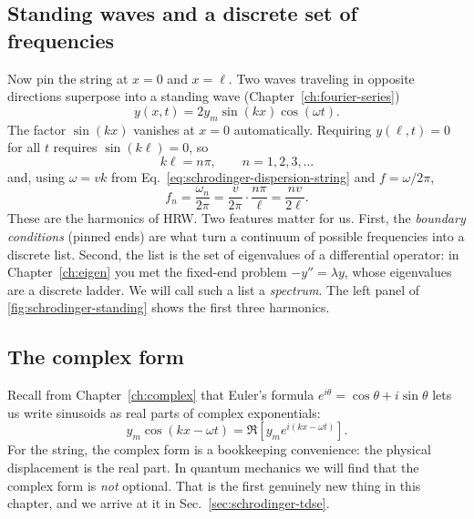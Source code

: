 \subsection{Standing waves and a discrete set of frequencies}

Now pin the string at $x=0$ and $x=\ell$. Two waves traveling in opposite directions superpose into a standing wave (Chapter~\ref{ch:fourier-series})
\begin{equation}
y(x,t)=2y_m\sin(kx)\cos(\omega t).
\label{eq:schrodinger-standing}
\end{equation}
The factor $\sin(kx)$ vanishes at $x=0$ automatically. Requiring $y(\ell,t)=0$ for all $t$ requires $\sin(k\ell)=0$, so
\begin{equation}
k\ell=n\pi,\qquad n=1,2,3,\dots
\end{equation}
and, using $\omega=vk$ from Eq.~\eqref{eq:schrodinger-dispersion-string} and $f=\omega/2\pi$,
\begin{equation}
f_n=\frac{\omega_n}{2\pi}=\frac{v}{2\pi}\cdot\frac{n\pi}{\ell}=\frac{nv}{2\ell}.
\label{eq:schrodinger-harmonics}
\end{equation}
These are the harmonics of HRW. Two features matter for us. First, the \emph{boundary conditions} (pinned ends) are what turn a continuum of possible frequencies into a discrete list. Second, the list is the set of eigenvalues of a differential operator: in Chapter~\ref{ch:eigen} you met the fixed-end problem $-y''=\lambda y$, whose eigenvalues are a discrete ladder. We will call such a list a \emph{spectrum}. The left panel of \cref{fig:schrodinger-standing} shows the first three harmonics.

\subsection{The complex form}

Recall from Chapter~\ref{ch:complex} that Euler's formula $e^{i\theta}=\cos\theta+i\sin\theta$ lets us write sinusoids as real parts of complex exponentials:
\begin{equation}
y_m\cos(kx-\omega t)=\Re\!\left[y_m e^{i(kx-\omega t)}\right].
\end{equation}
For the string, the complex form is a bookkeeping convenience: the physical displacement is the real part. In quantum mechanics we will find that the complex form is \emph{not} optional. That is the first genuinely new thing in this chapter, and we arrive at it in Sec.~\ref{sec:schrodinger-tdse}.

